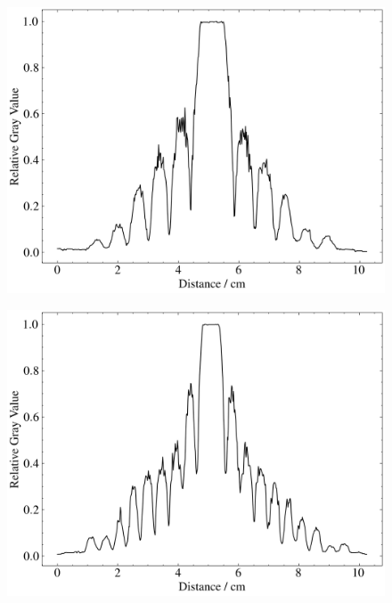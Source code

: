 \begin{figure}[htbp]
\begin{minipage}[ht]{0.48\hsize}
		\includegraphics[width=\linewidth]{src/figures/result/ss2_data_amp.png}
		\label{subfig:ss2_amp}
	\end{minipage}
	\begin{minipage}[ht]{0.48\hsize}\centering
		\includegraphics[width=\linewidth]{src/figures/result/ss3_data_amp.png}
		\label{subfig:ss3_amp}
	\end{minipage}
	\begin{minipage}[ht]{0.48\hsize}\centering

\end{minipage}
\end{figure}
